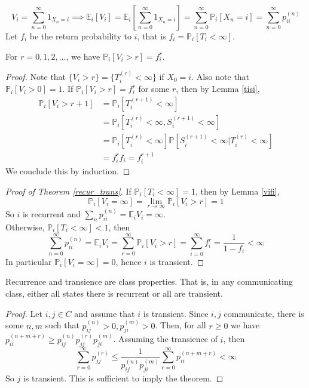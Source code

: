 $$V_i=\sum_{n=0}^\infty 1_{X_n=i}\implies \mathbb E_i[V_i]=\mathbb E_i\left[ \sum_{n=0}^\infty 1_{X_n=i} \right]=\sum_{n=0}^\infty\mathbb P_i[X_n=i]=\sum_{n=0}^\infty p_{ii}^{(n)}$$
Let $f_i$ be the return probability to $i$, that is $f_i=\mathbb P_i[T_i<\infty]$.
\begin{lemma}\label{vifi}
    For $r=0,1,2,\ldots$, we have $\mathbb P_i[V_i>r]=f_i^r$.
\end{lemma}
\begin{proof}
    Note that $\{V_i>r\}=\{T_i^{(r)}<\infty\}$ if $X_0=i$.
    Also note that $\mathbb P_i[V_i>0]=1$.
    If $\mathbb P_i[V_i>r]=f_i^r$ for some $r$, then by Lemma \ref{tisi},
    \begin{align*}
        \mathbb P_i[V_i>r+1]&=\mathbb P_i[T_i^{(r+1)}<\infty]\\
        &=\mathbb P_i[T_i^{(r)}<\infty,S_i^{(r+1)}<\infty]\\
        &=\mathbb P_i[T_i^{(r)}<\infty]\mathbb P[S_i^{(r+1)}<\infty|T_i^{(r)}<\infty]\\
        &=f_i^rf_i=f_i^{r+1}
    \end{align*}
    We conclude this by induction.
\end{proof}
\begin{proof}[Proof of Theorem \ref{recur_trans}]
    If $\mathbb P_i[T_i<\infty]=1$, then by Lemma \ref{vifi},
    $$\mathbb P_i[V_i=\infty]=\lim_{r\to\infty}\mathbb P_i[V_i>r]=1$$
    So $i$ is recurrent and $\sum_{n}p_{ii}^{(n)}=\mathbb E_iV_i=\infty$.\\
    Otherwise, $\mathbb P_i[T_i<\infty]<1$, then
    $$\sum_{n=0}^\infty p_{ii}^{(n)}=\mathbb E_iV_i=\sum_{r=0}^\infty\mathbb P_i[V_i>r]=\sum_{i=0}^\infty f_i^r=\frac{1}{1-f_i}<\infty$$
    In particular $\mathbb P_i[V_i=\infty]=0$, hence $i$ is transient.
\end{proof}
\begin{theorem}
    Recurrence and transience are class properties.
    That is, in any communicating class, either all states there is recurrent or all are transient.
\end{theorem}
\begin{proof}
    Let $i,j\in C$ and assume that $i$ is transient.
    Since $i,j$ communicate, there is some $n,m$ such that $p_{ij}^{(n)}>0,p_{ji}^{(m)}>0$.
    Then, for all $r\ge 0$ we have $p_{ii}^{(n+m+r)}\ge p_{ij}^{(n)}p_{jj}^{(r)}p_{ji}^{(m)}$.
    Assuming the transience of $i$, then
    $$\sum_{r=0}^\infty p_{jj}^{(r)}\le\frac{1}{p_{ij}^{(n)}p_{ji}^{(m)}}\sum_{r=0}^\infty p_{ii}^{(n+m+r)}<\infty$$
    So $j$ is transient.
    This is sufficient to imply the theorem.
\end{proof}
